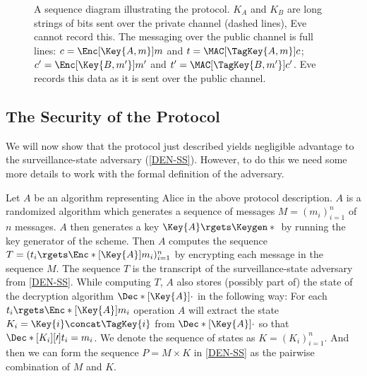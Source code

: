 \begin{figure}
  \centering
  \begin{msc}[msc keyword=]{}


    \nextlevel{}

    \nextlevel{}

    \nextlevel[1.6]


  \end{msc}
  \caption{%
    A sequence diagram illustrating the protocol.
    \(K_A\) and \(K_B\) are long strings of bits sent over the private channel 
    (dashed lines), Eve cannot record this.
    The messaging over the public channel is full lines:
    \(c = \Enc[\Key{A,m}]{ m }\) and \(t = \MAC[\TagKey{A,m}]{ c }\);
    \(c^\prime = \Enc[\Key{B,m^\prime}]{ m^\prime }\) and \(t^\prime 
      = \MAC[\TagKey{B,m^\prime}]{ c^\prime }\).
    Eve records this data as it is sent over the public channel.
  }\label{ProtocolOverview}
\end{figure}

\subsection{The Security of the Protocol}

We will now show that the protocol just described yields negligible advantage 
to the surveillance-state adversary (\cref{DEN-SS}).
However, to do this we need some more details to work with the formal 
definition of the adversary.

Let \(A\) be an algorithm representing Alice in the above protocol description.
\(A\) is a randomized algorithm which generates a sequence of messages \(M 
  = ( m_i )_{i=1}^n\) of \(n\) messages.
\(A\) then generates a key \(\Key{A}\rgets \Keygen*{}\) by running the key 
generator of the scheme.
Then \(A\) computes the sequence \(T = ( t_i\rgets\Enc*[\Key{A}]{ m_i 
  } )_{i=1}^n\) by encrypting each message in the sequence \(M\).
The sequence \(T\) is the transcript of the surveillance-state adversary from 
\cref{DEN-SS}.
While computing \(T\), \(A\) also stores (possibly part of) the state of the 
decryption algorithm \(\Dec*[\Key{A}]{\cdot}\) in the following way:
For each \(t_i\rgets\Enc*[\Key{A}]{ m_i }\) operation \(A\) will extract the 
state \(K_i = \Key{i}\concat \TagKey{i}\) from \(\Dec*[\Key{A}]{\cdot}\) so 
that \(\Dec*[K_i][\prime]{t_i} = m_i\).
We denote the sequence of states as \(K = ( K_i )_{i=1}^{n}\).
And then we can form the sequence \(P = M\times K\) in \cref{DEN-SS} as the 
pairwise combination of \(M\) and \(K\).

